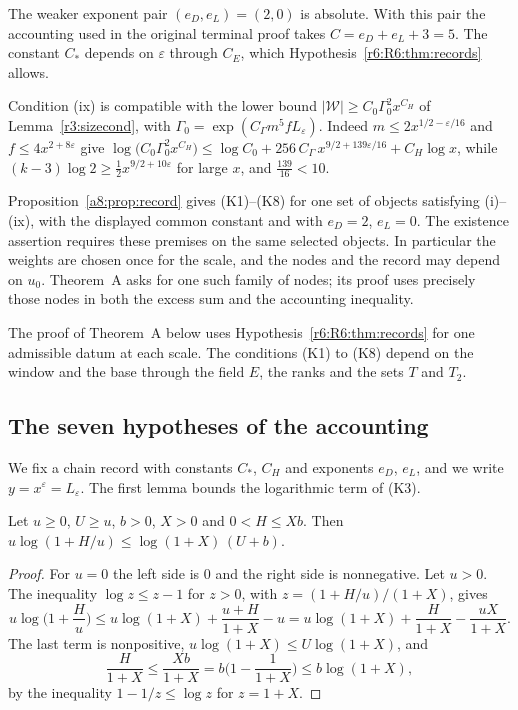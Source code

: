 The weaker exponent pair $(e_D,e_L)=(2,0)$ is absolute. With this pair the accounting used in the original terminal proof takes $C=e_D+e_L+3=5$. The constant $C_\ast$ depends on $\varepsilon$ through $C_E$, which Hypothesis~\ref{r6:R6:thm:records} allows.

Condition (ix) is compatible with the lower bound $\lvert\mathcal W\rvert\ge C_0\Gamma_0^2x^{C_H}$ of Lemma~\ref{r3:sizecond}, with $\Gamma_0=\exp(C_\Gamma m^5fL_\varepsilon)$. Indeed $m\le2x^{1/2-\varepsilon/16}$ and $f\le4x^{2+8\varepsilon}$ give $\log\big(C_0\Gamma_0^2x^{C_H}\big)\le\log C_0+256\,C_\Gamma\,x^{9/2+139\varepsilon/16}+C_H\log x$, while $(k-3)\log2\ge\frac12x^{9/2+10\varepsilon}$ for large $x$, and $\frac{139}{16}<10$.



Proposition~\ref{a8:prop:record} gives (K1)--(K8) for one set of
objects satisfying (i)--(ix), with the displayed common constant and
with $e_D=2$, $e_L=0$. The existence assertion requires these premises
on the same selected objects. In particular the weights are chosen once
for the scale, and the nodes and the record may depend on $u_0$.
Theorem~A asks for one such family of nodes; its proof uses precisely
those nodes in both the excess sum and the accounting inequality.

The proof of Theorem~A below uses Hypothesis~\ref{r6:R6:thm:records} for one admissible datum at each scale. The conditions (K1) to (K8) depend on the window and the base through the field $E$, the ranks and the sets $T$ and $T_2$.

\subsection{The seven hypotheses of the accounting}\label{r6:R6:sec:A1A7}

We fix a chain record with constants $C_\ast$, $C_H$ and exponents $e_D$, $e_L$, and we write $y=x^{\varepsilon}=L_\varepsilon$. The first lemma bounds the logarithmic term of (K3).

\begin{lemma}\label{r6:R6:lem:phi}
Let $u\ge0$, $U\ge u$, $b>0$, $X>0$ and $0<H\le Xb$. Then $u\log(1+H/u)\le\log(1+X)\,(U+b)$.
\end{lemma}

\begin{proof}
For $u=0$ the left side is $0$ and the right side is nonnegative. Let $u>0$. The inequality $\log z\le z-1$ for $z>0$, with $z=(1+H/u)/(1+X)$, gives
\[
u\log\Big(1+\frac Hu\Big)\le u\log(1+X)+\frac{u+H}{1+X}-u=u\log(1+X)+\frac H{1+X}-\frac{uX}{1+X}.
\]
The last term is nonpositive, $u\log(1+X)\le U\log(1+X)$, and
\[
\frac H{1+X}\le\frac{Xb}{1+X}=b\Big(1-\frac1{1+X}\Big)\le b\log(1+X),
\]
by the inequality $1-1/z\le\log z$ for $z=1+X$.
\end{proof}

